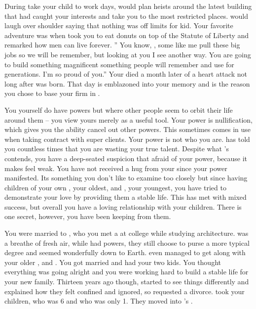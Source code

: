 \documentclass[char]{LRSguildcamp1}
\begin{document}
During take your child to work days, \cGS{} would plan \cGS{\their} heists around the latest building that had caught your interests and take you to the most restricted places. \cGS{} would laugh over \cGS{\their} shoulder saying that nothing was off limits for \cGS{\their} kid. Your favorite adventure was when \cGS{\they} took you to eat donuts on top of the Statute of Liberty and remarked how men can live forever.  '' You know, \cArchitect{}, some \cGS{\humans} like me pull these big jobs so we will be remember, but looking at you I see another way. You are going to build something magnificent something people will remember and use for generations. I'm so proud of you.'' Your \cGS{\parent} died a month later of a heart attack not long after \cYoungest{} was born. That day is emblazoned into your memory and is the reason you chose to base your firm in \pCityArchitect{}.

You yourself do have powers but where other people seem to orbit their life around them -- you view yours merely as a useful tool. Your power is nullification, which gives you the ability cancel out other powers. This sometimes comes in use when taking contract with super clients. Your power is not who you are. \cGrandma{} has told you countless times that you are wasting your true talent. Despite what \cGrandma{} 's contends, you have a deep-seated suspicion that \cGrandma{\theyare} afraid of your power, because it makes \cGrandma{\them} feel weak. You have not received a hug from your \cGrandma{\parent} since your power manifested. Its something you don't like to examine too closely but since having children of your own \cTeen{}, your oldest, and \cTween{}, your youngest, you have tried to demonstrate your love by providing them a stable life. This has met with mixed success, but overall you have a loving relationship with your children.  There is one secret, however, you have been keeping from them. 

You were married to \cAS{}, who you met a at college while studying architecture. \cAS{} was a breathe of fresh air, while \cAS{\they} had powers, they still choose to purse a more typical degree and seemed wonderfully down to Earth. \cAS{} even managed to get along with your older \cOldest{\sibling}, \cOldest{} and \cOldest{\their} \cOS{\spouse} \cOS{}. You got married and had your two kids. You thought everything was going alright and you were working hard to build a stable life for your new family.  Thirteen years ago though, \cAS{} started to see things differently and \cAS{\they} explained how they felt confined and ignored, so requested a divorce. \cAS{} took your children, \cTeen{} who was 6 and \cTween{} who was only 1. They moved into \cOldest{}'s \pCityO{}. 
\end{document}
